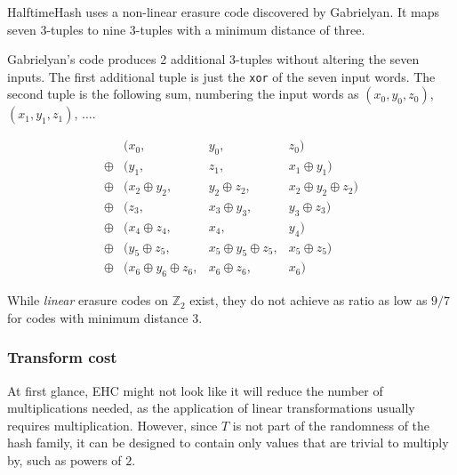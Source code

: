 \documentclass[runningheads]{llncs}
\newcommand{\ints}{\mathbb{Z}}
\begin{document}

HalftimeHash uses a non-linear erasure code discovered by Gab\-ri\-el\-yan. \cite{9-7-erasure-code}
It maps seven 3-tuples to nine 3-tuples with a minimum distance of three.

Gabrielyan's code produces 2 additional 3-tuples without altering the seven inputs.
The first additional tuple is just the \texttt{xor} of the seven input words.
The second tuple is the following sum, numbering the input words as $(x_0, y_0, z_0)$, $(x_1, y_1, z_1)$, $\dots$.

\begin{displaymath}
  \begin{array}{rlcr}
       & (x_0, & y_0, & z_0)\\
\oplus & (y_1,  & z_1,  & x_1 \oplus{} y_1) \\
\oplus & (x_2 \oplus{} y_2,& y_2 \oplus{} z_2,& x_2 \oplus{} y_2 \oplus{} z_2)\\
\oplus & (z_3,    &x_3 \oplus{} y_3,& y_3 \oplus{} z_3) \\
\oplus & (x_4 \oplus{} z_4,& x_4,& y_4)\\
\oplus & (y_5 \oplus{} z_5,& x_5 \oplus{} y_5 \oplus{} z_5,& x_5\oplus{}z_5)\\
\oplus & (x_6 \oplus{} y_6 \oplus{} z_6,& x_6 \oplus{} z_6,& x_6)
  \end{array}
\end{displaymath}

While {\em linear} erasure codes on $\ints_2$ exist, they do not achieve as ratio as low as $9/7$ for codes with minimum distance 3. \cite{codetables.de}

\subsubsection{Transform cost}

At first glance, EHC might not look like it will reduce the number of multiplications needed, as the application of linear transformations usually requires multiplication.
However, since $T$ is not part of the randomness of the hash family, it can be designed to contain only values that are trivial to multiply by, such as powers of $2$.
\end{document}
